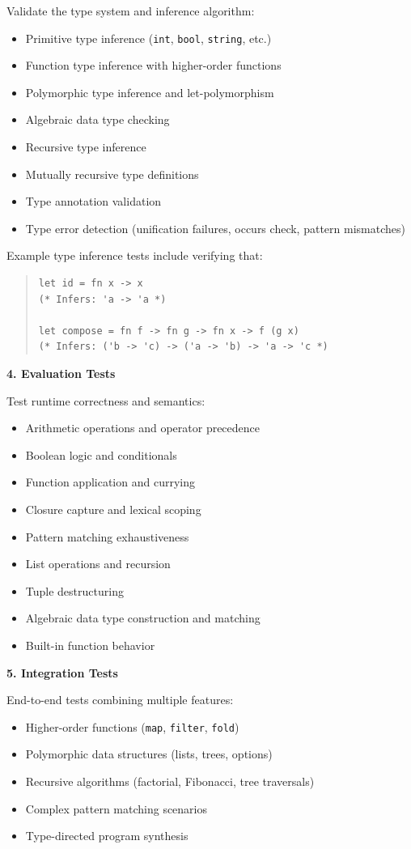 \documentclass[conference,onecolumn]{IEEEtran}
\begin{document}
Validate the type system and inference algorithm:
\begin{itemize}
\item Primitive type inference (\texttt{int}, \texttt{bool}, \texttt{string}, etc.)
\item Function type inference with higher-order functions
\item Polymorphic type inference and let-polymorphism
\item Algebraic data type checking
\item Recursive type inference
\item Mutually recursive type definitions
\item Type annotation validation
\item Type error detection (unification failures, occurs check, pattern mismatches)
\end{itemize}

Example type inference tests include verifying that:
\begin{quote}
\small
\begin{verbatim}
let id = fn x -> x
(* Infers: 'a -> 'a *)

let compose = fn f -> fn g -> fn x -> f (g x)
(* Infers: ('b -> 'c) -> ('a -> 'b) -> 'a -> 'c *)
\end{verbatim}
\end{quote}

\textbf{4. Evaluation Tests}

Test runtime correctness and semantics:
\begin{itemize}
\item Arithmetic operations and operator precedence
\item Boolean logic and conditionals
\item Function application and currying
\item Closure capture and lexical scoping
\item Pattern matching exhaustiveness
\item List operations and recursion
\item Tuple destructuring
\item Algebraic data type construction and matching
\item Built-in function behavior
\end{itemize}

\textbf{5. Integration Tests}

End-to-end tests combining multiple features:
\begin{itemize}
\item Higher-order functions (\texttt{map}, \texttt{filter}, \texttt{fold})
\item Polymorphic data structures (lists, trees, options)
\item Recursive algorithms (factorial, Fibonacci, tree traversals)
\item Complex pattern matching scenarios
\item Type-directed program synthesis
\end{itemize}
\end{document}
